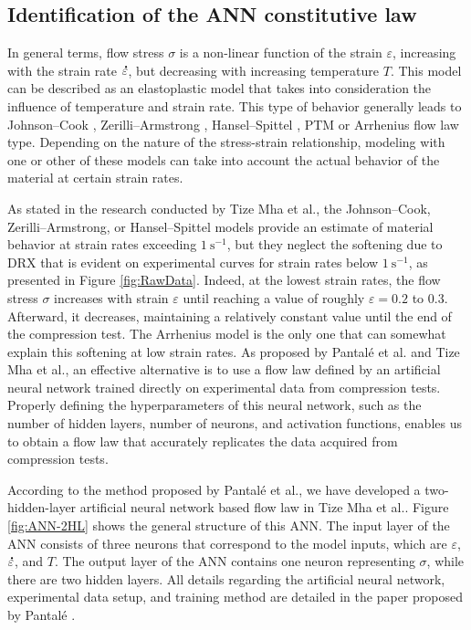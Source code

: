\documentclass[metals,article,submit,pdftex,moreauthors]{Definitions/mdpi}
\makeatletter
\DeclareRobustCommand{\mdot}[1]{\accentset{\mbox{\bfseries .}}{#1}}
\DeclareRobustCommand{\eal}{et al.\@\xspace}
\DeclareRobustCommand{\ps}{\text{s}^{-1}}
\makeatother
\begin{document}
\subsection{Identification of the ANN constitutive law\label{subsec:ANNConstitutiveLaw}}

In general terms, flow stress $\sigma$ is a non-linear function of the strain $\varepsilon$, increasing with the strain rate $\mdot\varepsilon$, but decreasing with increasing temperature $T$.
This model can be described as an elastoplastic model that takes into consideration the influence of temperature and strain rate.
This type of behavior generally leads to Johnson--Cook \cite{Johnson-1983}, Zerilli--Armstrong \cite{Zerilli-1987}, Hansel--Spittel \cite{Hensel-1978}, PTM \cite{mha2022generalized} or Arrhenius \cite{Sellars-1966} flow law type.
Depending on the nature of the stress-strain relationship, modeling with one or other of these models can take into account the actual behavior of the material at certain strain rates.

As stated in the research conducted by Tize Mha \eal \cite{TizeMha-2023}, the Johnson--Cook, Zerilli--Armstrong, or Hansel--Spittel models provide an estimate of material behavior at strain rates exceeding $1~\ps$, but they neglect the softening due to DRX that is evident on experimental curves for strain rates below $1~\ps$, as presented in Figure \ref{fig:RawData}.
Indeed, at the lowest strain rates, the flow stress $\sigma$ increases with strain $\varepsilon$ until reaching a value of roughly $\varepsilon=0.2$ to $0.3$.
Afterward, it decreases, maintaining a relatively constant value until the end of the compression test.
The Arrhenius model is the only one that can somewhat explain this softening at low strain rates.
As proposed by Pantalé \eal \cite{Pantale-2021, Pantale-2023} and Tize Mha \eal \cite{TizeMha-2023}, an effective alternative is to use a flow law defined by an artificial neural network trained directly on experimental data from compression tests.
Properly defining the hyperparameters of this neural network, such as the number of hidden layers, number of neurons, and activation functions, enables us to obtain a flow law that accurately replicates the data acquired from compression tests.

According to the method proposed by Pantalé \eal \cite{Pantale-2021, Pantale-2023}, we have developed a two-hidden-layer artificial neural network based flow law in Tize Mha \eal \cite{TizeMha-2023}.
Figure \ref{fig:ANN-2HL} shows the general structure of this ANN.
The input layer of the ANN consists of three neurons that correspond to the model inputs, which are $\varepsilon$, $\mdot\varepsilon$, and $T$.
The output layer of the ANN contains one neuron representing $\sigma$, while there are two hidden layers.
All details regarding the artificial neural network, experimental data setup, and training method are detailed in the paper proposed by Pantalé \cite{Pantale-2023}.
\end{document}

